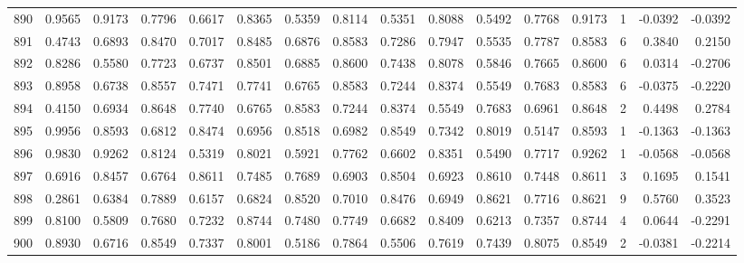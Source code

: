 \begin{tabular}{lrrrrrrrrrrrrrrr}
890 &      0.9565 &  0.9173 &  0.7796 &  0.6617 &  0.8365 &  0.5359 &  0.8114 &  0.5351 &  0.8088 &  0.5492 &   0.7768 &     0.9173 &      1 &                   -0.0392 &                    -0.0392 \\
891 &      0.4743 &  0.6893 &  0.8470 &  0.7017 &  0.8485 &  0.6876 &  0.8583 &  0.7286 &  0.7947 &  0.5535 &   0.7787 &     0.8583 &      6 &                    0.3840 &                     0.2150 \\
892 &      0.8286 &  0.5580 &  0.7723 &  0.6737 &  0.8501 &  0.6885 &  0.8600 &  0.7438 &  0.8078 &  0.5846 &   0.7665 &     0.8600 &      6 &                    0.0314 &                    -0.2706 \\
893 &      0.8958 &  0.6738 &  0.8557 &  0.7471 &  0.7741 &  0.6765 &  0.8583 &  0.7244 &  0.8374 &  0.5549 &   0.7683 &     0.8583 &      6 &                   -0.0375 &                    -0.2220 \\
894 &      0.4150 &  0.6934 &  0.8648 &  0.7740 &  0.6765 &  0.8583 &  0.7244 &  0.8374 &  0.5549 &  0.7683 &   0.6961 &     0.8648 &      2 &                    0.4498 &                     0.2784 \\
895 &      0.9956 &  0.8593 &  0.6812 &  0.8474 &  0.6956 &  0.8518 &  0.6982 &  0.8549 &  0.7342 &  0.8019 &   0.5147 &     0.8593 &      1 &                   -0.1363 &                    -0.1363 \\
896 &      0.9830 &  0.9262 &  0.8124 &  0.5319 &  0.8021 &  0.5921 &  0.7762 &  0.6602 &  0.8351 &  0.5490 &   0.7717 &     0.9262 &      1 &                   -0.0568 &                    -0.0568 \\
897 &      0.6916 &  0.8457 &  0.6764 &  0.8611 &  0.7485 &  0.7689 &  0.6903 &  0.8504 &  0.6923 &  0.8610 &   0.7448 &     0.8611 &      3 &                    0.1695 &                     0.1541 \\
898 &      0.2861 &  0.6384 &  0.7889 &  0.6157 &  0.6824 &  0.8520 &  0.7010 &  0.8476 &  0.6949 &  0.8621 &   0.7716 &     0.8621 &      9 &                    0.5760 &                     0.3523 \\
899 &      0.8100 &  0.5809 &  0.7680 &  0.7232 &  0.8744 &  0.7480 &  0.7749 &  0.6682 &  0.8409 &  0.6213 &   0.7357 &     0.8744 &      4 &                    0.0644 &                    -0.2291 \\
900 &      0.8930 &  0.6716 &  0.8549 &  0.7337 &  0.8001 &  0.5186 &  0.7864 &  0.5506 &  0.7619 &  0.7439 &   0.8075 &     0.8549 &      2 &                   -0.0381 &                    -0.2214 \\

\end{tabular}
